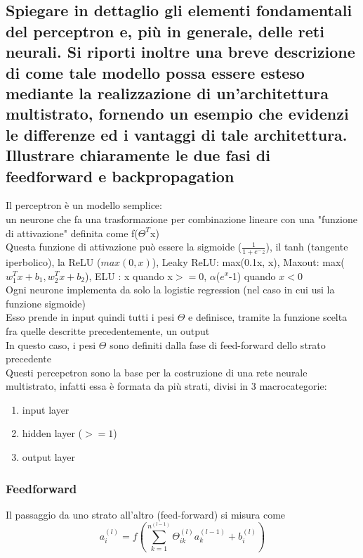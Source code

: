 \documentclass[10pt,oneside,a4paper]{article}
\begin{document}
	\subsection{Spiegare in dettaglio gli elementi fondamentali del perceptron e, più in generale, delle reti
		neurali. Si riporti inoltre una breve descrizione di come tale modello possa essere esteso
		mediante la realizzazione di un’architettura multistrato, fornendo un esempio che evidenzi
		le differenze ed i vantaggi di tale architettura. Illustrare chiaramente le due fasi di feedforward e backpropagation}
	Il perceptron è un modello semplice:\\
	un neurone che fa una trasformazione per combinazione lineare con una "funzione di attivazione" definita come f($\Theta^T$x)\\
	Questa funzione di attivazione può essere la sigmoide ($\frac{1}{1+e^-z}$), il tanh (tangente iperbolico), la ReLU ($max(0,x)$), Leaky ReLU: max(0.1x, x), Maxout: max($w_1^Tx+b_1, w_2^Tx+b_2$), ELU : x quando x$>=0$, $\alpha$($e^x$-1) quando $x<0$\\
	Ogni neurone implementa da solo la logistic regression (nel caso in cui usi la funzione sigmoide)\\
	Esso prende in input quindi tutti i pesi $\Theta$ e definisce, tramite la funzione scelta fra quelle descritte precedentemente, un output\\
	In questo caso, i pesi $\Theta$ sono definiti dalla fase di feed-forward dello strato precedente\\
	Questi percepetron sono la base per la costruzione di una rete neurale multistrato, infatti essa è formata da più strati, divisi in 3 macrocategorie:
	\begin{enumerate}
		\item input layer
		\item hidden layer ($>=1$)
		\item output layer
	\end{enumerate}
	\subsubsection{Feedforward}
	Il passaggio da uno strato all'altro (feed-forward) si misura come
	\[
	a_i^{(l)} = f\left(\sum_{k=1}^{n^{(l-1)}} \Theta_{ik}^{(l)} a_k^{(l-1)} + b_i^{(l)}\right)
	\]
	
\end{document}
